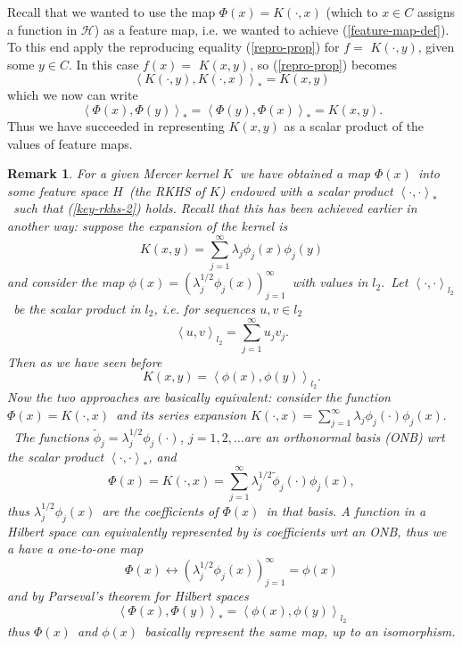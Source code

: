 \documentclass[11pt,twoside]{article}%
\theoremstyle{change}
\newtheorem{remark}[theorem]{Remark}
\begin{document}
Recall that we wanted to use the map $\Phi(x)=K(\cdot,x)$ (which to $x\in C $
assigns a function in $\mathcal{H}$) as a feature map, i.e. we wanted to
achieve (\ref{feature-map-def}). To this end apply the reproducing equality
(\ref{repro-prop}) for $f=$ $K(\cdot,y)$, given some $y\in C$. In this case
$f(x)=$ $K(x,y)$, so (\ref{repro-prop}) becomes
\[
\left\langle K(\cdot,y),K(\cdot,x)\right\rangle _{\ast}=K(x,y)
\]
which we now can write
\begin{equation}
\left\langle \Phi(x),\Phi(y)\right\rangle _{\ast}=\left\langle \Phi
(y),\Phi(x)\right\rangle _{\ast}=K(x,y).\label{key-rkhs-2}%
\end{equation}
Thus we have succeeded in representing $K\left(  x,y\right)  $ as a scalar
product of the values of feature maps.

\bigskip

\begin{remark}
\label{rem-feature-map-def}\emph{For a given Mercer kernel }$K$\emph{\ we have
obtained a map }$\Phi(x)$\emph{\ into some feature space }$H$\emph{\ (the RKHS
of }$K$\emph{) endowed with a scalar product }$\left\langle \cdot
,\cdot\right\rangle _{\ast}$\emph{\ such that (\ref{key-rkhs-2}) holds. Recall
that this has been achieved earlier in another way: suppose the expansion of
the kernel is }%
\[
K(x,y)=\sum_{j=1}^{\infty}\lambda_{j}\phi_{j}(x)\phi_{j}(y)
\]
\emph{and consider the map }$\phi(x)=\left(  \lambda_{j}^{1/2}\phi
_{j}(x)\right)  _{j=1}^{\infty}$\emph{\ with values in }$l_{2}.$\emph{\ Let
}$\left\langle \cdot,\cdot\right\rangle _{l_{2}}$\emph{\ be the scalar product
in }$l_{2}$\emph{, i.e. for sequences }$u,v\in l_{2}$\emph{\ }%
\[
\left\langle u,v\right\rangle _{l_{2}}=\sum_{j=1}^{\infty}u_{j}v_{j}\text{.}%
\]
\emph{Then as we have seen before }%
\[
K(x,y)=\left\langle \phi(x),\phi(y)\right\rangle _{l_{2}}.
\]
\emph{Now the two approaches are basically equivalent: consider the function
}$\Phi(x)=K(\cdot,x)$\emph{\ and its series expansion }$K(\cdot,x)=\sum
_{j=1}^{\infty}\lambda_{j}\phi_{j}(\cdot)\phi_{j}(x).$\emph{\ The functions
}$\tilde{\phi}_{j}=\lambda_{j}^{1/2}\phi_{j}(\cdot)$\emph{, }$j=1,2,\ldots
$\emph{are an orthonormal basis (ONB) wrt the scalar product }$\left\langle
\cdot,\cdot\right\rangle _{\ast}$\emph{, and }%
\[
\Phi(x)=K(\cdot,x)=\sum_{j=1}^{\infty}\lambda_{j}^{1/2}\tilde{\phi}_{j}%
(\cdot)\phi_{j}(x),
\]
\emph{thus }$\lambda_{j}^{1/2}\phi_{j}(x)$\emph{\ are the coefficients of
}$\Phi(x)$\emph{\ in that basis. A function in a Hilbert space can
equivalently represented by is coefficients wrt an ONB, thus we a have a
one-to-one map}%
\[
\Phi(x)\leftrightarrow\left(  \lambda_{j}^{1/2}\phi_{j}(x)\right)
_{j=1}^{\infty}=\phi(x)
\]
\emph{and by Parseval's theorem for Hilbert spaces }%
\[
\left\langle \Phi(x),\Phi(y)\right\rangle _{\ast}=\left\langle \phi
(x),\phi(y)\right\rangle _{l_{2}}%
\]
\emph{thus }$\Phi(x)$\emph{\ and }$\phi(x)$\emph{\ basically represent the
same map, up to an isomorphism.}
\end{remark}
\end{document}
